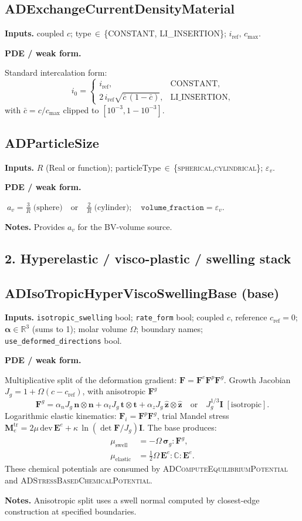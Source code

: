 \documentclass[11pt]{article}
\newcommand{\eps}{\varepsilon}
\newcommand{\nvec}{\mathbf{n}}
\newenvironment{ecmEntry}[1]{%
  \subsection{#1}%
}{}
\newcommand{\inputsRow}[1]{\par\noindent\textbf{Inputs.} #1\par}
\newcommand{\pdeRow}[1]{\par\noindent\textbf{PDE / weak form.}\par #1\par}
\newcommand{\notesRow}[1]{\par\noindent\textbf{Notes.} #1\par}
\begin{document}
\begin{ecmEntry}{ADExchangeCurrentDensityMaterial}
\inputsRow{coupled $c$; type\,$\in$\,\{CONSTANT, LI\_INSERTION\}; $i_{\text{ref}},\,c_{\max}$.}
\pdeRow{Standard intercalation form:
\[
  i_0 = \begin{cases} i_{\text{ref}}, & \text{CONSTANT},\\
   2\,i_{\text{ref}}\sqrt{\bar c\,(1-\bar c)}, & \text{LI\_INSERTION,}\end{cases}
\]
with $\bar c=c/c_{\max}$ clipped to $[10^{-3},1-10^{-3}]$.}
\end{ecmEntry}

\begin{ecmEntry}{ADParticleSize}
\inputsRow{$R$ (Real or function); particleType\,$\in$\,\{\textsc{spherical},\textsc{cylindrical}\};
$\eps_v$.}
\pdeRow{$\;a_v = \frac{3}{R}\;\text{(sphere)}\quad\text{or}\quad \frac{2}{R}\;\text{(cylinder)};\quad
   \texttt{volume\_fraction}=\eps_v.$}
\notesRow{Provides $a_v$ for the BV-volume source.}
\end{ecmEntry}

\subsection*{2. Hyperelastic / visco-plastic / swelling stack}

\begin{ecmEntry}{ADIsoTropicHyperViscoSwellingBase (base)}
\label{mat-swelling-base}
\inputsRow{\texttt{isotropic\_swelling} bool; \texttt{rate\_form} bool;
coupled $c$, reference $c_{\text{ref}}=0$;
$\bm{\alpha}\!\in\!\mathbb{R}^3$ (sums to 1); molar volume $\Omega$;
boundary names; \texttt{use\_deformed\_directions} bool.}
\pdeRow{Multiplicative split of the deformation gradient:
$\mathbf{F} = \mathbf{F}^e\mathbf{F}^p\mathbf{F}^g$. Growth Jacobian
$J_g = 1 + \Omega(c-c_{\text{ref}})$, with anisotropic $\mathbf{F}^g$
\[
  \mathbf{F}^g = \alpha_n J_g\,\nvec\!\otimes\!\nvec + \alpha_t J_g\,\bm{t}\!\otimes\!\bm{t} +
                \alpha_z J_g\,\hat{\bm z}\!\otimes\!\hat{\bm z}\quad\text{or}\quad
  J_g^{1/3}\mathbf{I}\;[\text{isotropic}].
\]
Logarithmic elastic kinematics: $\bm{F}_i=\bm{F}^p\bm{F}^g$, trial Mandel stress
$\bm{M}_e^{\text{tr}} = 2\mu\,\mathrm{dev}\,\bm{E}^e + \kappa\,\ln(\det\bm{F}/J_g)\bm{I}$.
The base produces:
\[
\begin{aligned}
\mu_{\text{swell}} &= -\Omega\,\bm{\sigma}_g:\bm{F}^g,\\
\mu_{\text{elastic}} &= \tfrac{1}{2}\Omega\,\bm{E}^e:\mathbb{C}:\bm{E}^e.
\end{aligned}
\]
These chemical potentials are consumed by \textsc{ADComputeEquilibriumPotential} and
\textsc{ADStressBasedChemicalPotential}.}
\notesRow{Anisotropic split uses a swell normal computed by closest-edge construction at
specified boundaries.}
\end{ecmEntry}
\end{document}
